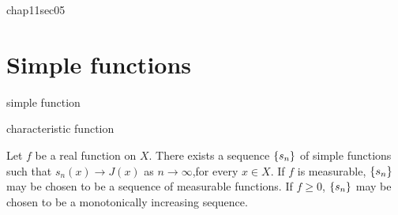 chap11sec05

\section{Simple functions}

\begin{mydef}
    \label{mydef:11.19}
    simple function

    characteristic function
\end{mydef}

\begin{thm}
    \label{thm:11.20}
    Let $f$ be a real function on $X$. 
    There exists a sequence $\protect\{s_n\}$ of simple functions such that $s_n(x) \rightarrow J(x)$ as $n \rightarrow  \infty$,for every $x \in X$. 
    If $f$ is measurable, $\protect\{s_n\}$ may be chosen to be a sequence of measurable functions. 
    If $f \geq 0$, $\protect\{s_n\}$ may be chosen to be a monotonically increasing sequence.
\end{thm}